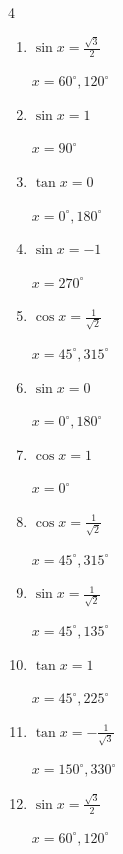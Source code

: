 \begin{multicols}{4}
\begin{enumerate}
  \item $\displaystyle \sin{x}  = \frac{\sqrt{3}}{2}$

        $\displaystyle x = 60^{\circ} , 120^{\circ}$

  \item $\displaystyle \sin{x}  = 1$

        $\displaystyle x = 90^{\circ}$

  \item $\displaystyle \tan{x}  = 0$

        $\displaystyle x = 0^{\circ} , 180^{\circ}$

  \item $\displaystyle \sin{x}  = -1$

        $\displaystyle x = 270^{\circ}$

  \item $\displaystyle \cos{x}  = \frac{1}{\sqrt{2}}$

        $\displaystyle x = 45^{\circ} , 315^{\circ}$

  \item $\displaystyle \sin{x}  = 0$

        $\displaystyle x = 0^{\circ} , 180^{\circ}$

  \item $\displaystyle \cos{x}  = 1$

        $\displaystyle x = 0^{\circ}$

  \item $\displaystyle \cos{x}  = \frac{1}{\sqrt{2}}$

        $\displaystyle x = 45^{\circ} , 315^{\circ}$

  \item $\displaystyle \sin{x}  = \frac{1}{\sqrt{2}}$

        $\displaystyle x = 45^{\circ} , 135^{\circ}$

  \item $\displaystyle \tan{x}  = 1$

        $\displaystyle x = 45^{\circ} , 225^{\circ}$

  \item $\displaystyle \tan{x}  = -\frac{1}{\sqrt{3}}$

        $\displaystyle x = 150^{\circ} , 330^{\circ}$

  \item $\displaystyle \sin{x}  = \frac{\sqrt{3}}{2}$

        $\displaystyle x = 60^{\circ} , 120^{\circ}$


\end{enumerate}
\end{multicols}
